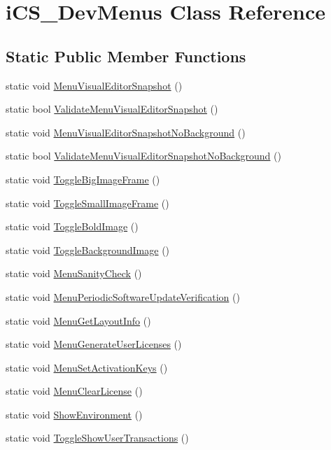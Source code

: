 \hypertarget{classi_c_s___dev_menus}{\section{i\+C\+S\+\_\+\+Dev\+Menus Class Reference}
\label{classi_c_s___dev_menus}
}
\subsection*{Static Public Member Functions}
\begin{DoxyCompactItemize}
\item 
static void \hyperlink{classi_c_s___dev_menus_a20ce66f191432818c1ccbb0d023409c3}{Menu\+Visual\+Editor\+Snapshot} ()
\item 
static bool \hyperlink{classi_c_s___dev_menus_a15b80e78695b42804f40949166e62e92}{Validate\+Menu\+Visual\+Editor\+Snapshot} ()
\item 
static void \hyperlink{classi_c_s___dev_menus_a1e4f4a6261bdae0ad43f32d04f10a938}{Menu\+Visual\+Editor\+Snapshot\+No\+Background} ()
\item 
static bool \hyperlink{classi_c_s___dev_menus_a8e024f0877cc71373047b6651e0da664}{Validate\+Menu\+Visual\+Editor\+Snapshot\+No\+Background} ()
\item 
static void \hyperlink{classi_c_s___dev_menus_a02072ca4a5b538946373840f98d14c2a}{Toggle\+Big\+Image\+Frame} ()
\item 
static void \hyperlink{classi_c_s___dev_menus_ae695641e323a2cecc352c727b0c71c90}{Toggle\+Small\+Image\+Frame} ()
\item 
static void \hyperlink{classi_c_s___dev_menus_a447c1a5386c3529c7d30b665f738ea4c}{Toggle\+Bold\+Image} ()
\item 
static void \hyperlink{classi_c_s___dev_menus_a0dc29d692ffc4653673f4a06c484aacc}{Toggle\+Background\+Image} ()
\item 
static void \hyperlink{classi_c_s___dev_menus_aa10ed343b5ad0fe14918321b7da3a450}{Menu\+Sanity\+Check} ()
\item 
static void \hyperlink{classi_c_s___dev_menus_a45d77bf598368962b653ac8e477c47f1}{Menu\+Periodic\+Software\+Update\+Verification} ()
\item 
static void \hyperlink{classi_c_s___dev_menus_ac7980bddf41efe62f473136bcccf9130}{Menu\+Get\+Layout\+Info} ()
\item 
static void \hyperlink{classi_c_s___dev_menus_a3314c8b0fa6038541fc598af4f383162}{Menu\+Generate\+User\+Licenses} ()
\item 
static void \hyperlink{classi_c_s___dev_menus_a9fe0a69c268e659b893899a155449aad}{Menu\+Set\+Activation\+Keys} ()
\item 
static void \hyperlink{classi_c_s___dev_menus_a35484cf9625c30f96f5593e1c16f33f7}{Menu\+Clear\+License} ()
\item 
static void \hyperlink{classi_c_s___dev_menus_aa8ffa170576fdd3595a5a6a7cb7b081a}{Show\+Environment} ()
\item 
static void \hyperlink{classi_c_s___dev_menus_a05553d32a660a939d25f3e0901af7316}{Toggle\+Show\+User\+Transactions} ()
\end{DoxyCompactItemize}
